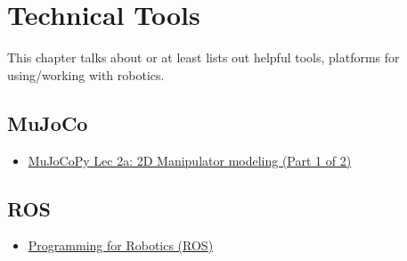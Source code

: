 \chapter{Technical Tools}

This chapter talks about or at least lists out helpful tools, platforms for using/working with robotics.

\section{MuJoCo}
\begin{itemize}
	\item \href{https://youtu.be/Fiq_hpaoeH0}{MuJoCoPy Lec 2a: 2D Manipulator modeling (Part 1 of 2)}
\end{itemize}

\section{ROS}
\begin{itemize}
	\item \href{https://youtube.com/playlist?list=PLE-BQwvVGf8HOvwXPgtDfWoxd4Cc6ghiP}{Programming for Robotics (ROS)}
\end{itemize}

